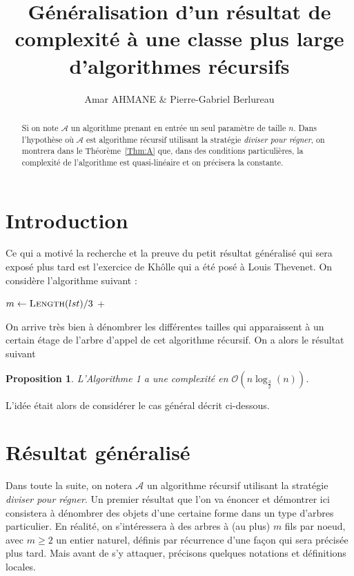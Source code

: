 \documentclass[a4paper,12pt,reqno]{amsart}
\newtheorem{proposition}[theorem]{Proposition}
\theoremstyle{remark}
\numberwithin{equation}{section}
\renewcommand{\geq}{\geqslant}
\begin{document}
\title{Généralisation d'un résultat de complexité à une classe plus large d'algorithmes récursifs}
\author{Amar AHMANE \& Pierre-Gabriel Berlureau}


\begin{abstract}
Si on note $\mathcal A$ un algorithme prenant en entrée un seul paramètre de taille $n$. Dans l'hypothèse où $\mathcal A$ est algorithme récursif utilisant la stratégie \textit{diviser pour régner}, on montrera dans le Théorème~\ref{Thm:A} que, dans des conditions particulières, la complexité de l'algorithme est quasi-linéaire et on précisera la constante.
\end{abstract}
\maketitle

\section{Introduction}
Ce qui a motivé la recherche et la preuve du petit résultat généralisé qui sera exposé plus tard est l'exercice de Khôlle qui a été posé à Louis Thevenet. On considère l'algorithme suivant :

\begin{algorithm}
\caption{}
\begin{algorithmic}[1]
		\State {}
	\EndIf
	\State $m \gets \Call{Length}{lst} / 3$
	\State \Return {} + 
\EndProcedure
\end{algorithmic}
\end{algorithm}
On arrive très bien à dénombrer les différentes tailles qui apparaissent à un certain étage de l'arbre d'appel de cet algorithme récursif. On a alors le résultat suivant

\begin{proposition}
L'Algorithme 1 a une complexité en $\mathcal O\left(n\log_{\frac 32}(n)\right)$.
\end{proposition}

L'idée était alors de considérer le cas général décrit ci-dessous.

\section{Résultat généralisé}
Dans toute la suite, on notera $\mathcal A$ un algorithme récursif utilisant la stratégie \textit{diviser pour régner}. Un premier résultat que l'on va énoncer et démontrer ici consistera à dénombrer des objets d'une certaine forme dans un type d'arbres particulier. En réalité, on s'intéressera à des arbres à (au plus) $m$ fils par noeud, avec $m\geq 2$ un entier naturel, définis par récurrence d'une façon qui sera précisée plus tard. Mais avant de s'y attaquer, précisons quelques notations et définitions locales.
\end{document}
